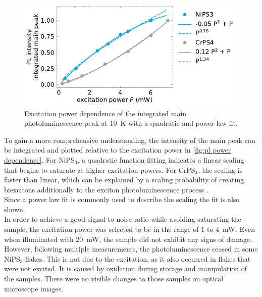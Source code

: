 \documentclass[
	twoside,
	parskip=half,
	a4paper,
]{scrbook}
\begin{document}
\begin{figure}
	\centering
	\includegraphics{../figures/2024-04-19 excitation power dependence of main pl line.pdf}
	\caption{Excitation power dependence of the integrated main photoluminescence peak at \SI{10}{K} with a quadratic and power law fit. }
	\label{fig:pl power dependence}
\end{figure}
To gain a more comprehensive understanding, the intensity of the main peak can be integrated and plotted relative to the excitation power in \autoref{fig:pl power dependence}.
For NiPS$_3$, a quadratic function fitting indicates a linear scaling that begins to saturate at higher excitation powers.
For CrPS$_4$, the scaling is faster than linear, which can be explained by a scaling probability of creating biexcitons additionally to the exciton photoluminescence process \cite{biexciton}. \\
Since a power law fit is commonly used to describe the scaling the fit is also shown.\\
In order to achieve a good signal-to-noise ratio while avoiding saturating the sample, the excitation power was selected to be in the range of \SI{1}{} to \SI{4}{mW}.
Even when illuminated with \SI{20}{mW}, the sample did not exhibit any signs of damage.\\
However, following multiple measurements, the photoluminescence ceased in some NiPS$_3$ flakes.
This is not due to the excitation, as it also occurred in flakes that were not excited.
It is caused by oxidation during storage and manipulation of the samples.
There were no visible changes to those samples on optical microscope images.
\end{document}
